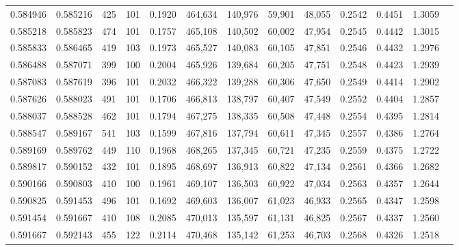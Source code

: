 \begin{tabular}{rrrrrrrrrrrrr}
0.584946 & 0.585216 &    425 &   101 &                                     0.1920 & 464,634 & 140,976 &  59,901 &  48,055 & 0.2542 & 0.4451 & 1.3059 \\
0.585218 & 0.585823 &    474 &   101 &                                     0.1757 & 465,108 & 140,502 &  60,002 &  47,954 & 0.2545 & 0.4442 & 1.3015 \\
0.585833 & 0.586465 &    419 &   103 &                                     0.1973 & 465,527 & 140,083 &  60,105 &  47,851 & 0.2546 & 0.4432 & 1.2976 \\
0.586488 & 0.587071 &    399 &   100 &                                     0.2004 & 465,926 & 139,684 &  60,205 &  47,751 & 0.2548 & 0.4423 & 1.2939 \\
0.587083 & 0.587619 &    396 &   101 &                                     0.2032 & 466,322 & 139,288 &  60,306 &  47,650 & 0.2549 & 0.4414 & 1.2902 \\
0.587626 & 0.588023 &    491 &   101 &                                     0.1706 & 466,813 & 138,797 &  60,407 &  47,549 & 0.2552 & 0.4404 & 1.2857 \\
0.588037 & 0.588528 &    462 &   101 &                                     0.1794 & 467,275 & 138,335 &  60,508 &  47,448 & 0.2554 & 0.4395 & 1.2814 \\
0.588547 & 0.589167 &    541 &   103 &                                     0.1599 & 467,816 & 137,794 &  60,611 &  47,345 & 0.2557 & 0.4386 & 1.2764 \\
0.589169 & 0.589762 &    449 &   110 &                                     0.1968 & 468,265 & 137,345 &  60,721 &  47,235 & 0.2559 & 0.4375 & 1.2722 \\
0.589817 & 0.590152 &    432 &   101 &                                     0.1895 & 468,697 & 136,913 &  60,822 &  47,134 & 0.2561 & 0.4366 & 1.2682 \\
0.590166 & 0.590803 &    410 &   100 &                                     0.1961 & 469,107 & 136,503 &  60,922 &  47,034 & 0.2563 & 0.4357 & 1.2644 \\
0.590825 & 0.591453 &    496 &   101 &                                     0.1692 & 469,603 & 136,007 &  61,023 &  46,933 & 0.2565 & 0.4347 & 1.2598 \\
0.591454 & 0.591667 &    410 &   108 &                                     0.2085 & 470,013 & 135,597 &  61,131 &  46,825 & 0.2567 & 0.4337 & 1.2560 \\
0.591667 & 0.592143 &    455 &   122 &                                     0.2114 & 470,468 & 135,142 &  61,253 &  46,703 & 0.2568 & 0.4326 & 1.2518 \\

\end{tabular}
